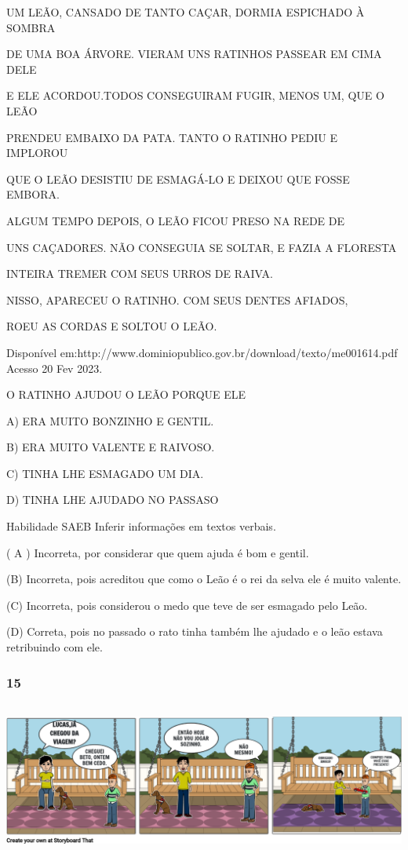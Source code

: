 \begin{escola}
UM LEÃO, CANSADO DE TANTO CAÇAR, DORMIA ESPICHADO À SOMBRA

DE UMA BOA ÁRVORE. VIERAM UNS RATINHOS PASSEAR EM CIMA DELE

E ELE ACORDOU.TODOS CONSEGUIRAM FUGIR, MENOS UM, QUE O LEÃO

PRENDEU EMBAIXO DA PATA. TANTO O RATINHO PEDIU E IMPLOROU

QUE O LEÃO DESISTIU DE ESMAGÁ-LO E DEIXOU QUE FOSSE EMBORA.

ALGUM TEMPO DEPOIS, O LEÃO FICOU PRESO NA REDE DE

UNS CAÇADORES. NÃO CONSEGUIA SE SOLTAR, E FAZIA A FLORESTA

INTEIRA TREMER COM SEUS URROS DE RAIVA.

NISSO, APARECEU O RATINHO. COM SEUS DENTES AFIADOS,

ROEU AS CORDAS E SOLTOU O LEÃO.

Disponível
em:http://www.dominiopublico.gov.br/download/texto/me001614.pdf Acesso
20 Fev 2023.

O RATINHO AJUDOU O LEÃO PORQUE ELE

A) ERA MUITO BONZINHO E GENTIL.

B) ERA MUITO VALENTE E RAIVOSO.

C) TINHA LHE ESMAGADO UM DIA.

D) TINHA LHE AJUDADO NO PASSASO

Habilidade SAEB Inferir informações em textos verbais.

\protect\hypertarget{_heading=h.37m2jsg}{}{}( A ) Incorreta, por
considerar que quem ajuda é bom e gentil.

(B) Incorreta, pois acreditou que como o Leão é o rei da selva ele é
muito valente.

(C) Incorreta, pois considerou o medo que teve de ser esmagado pelo
Leão.

(D) Correta, pois no passado o rato tinha também lhe ajudado e o leão
estava retribuindo com ele.

\subsubsection{15}\label{section-55}

\includegraphics[width=6.13750in,height=2.02917in]{media/image221.png}


\end{escola}
